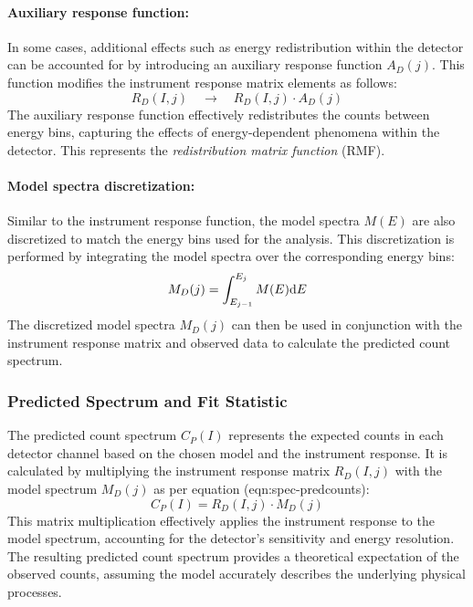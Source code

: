 				\paragraph{Auxiliary response function:}
				In some cases, additional effects such as energy redistribution within the detector can be accounted for by introducing an auxiliary response function $A_D(j)$. This function modifies the instrument response matrix elements as follows:
				\begin{equation*}
					R_D(I,j)\quad\rightarrow\quad R_D(I,j)\cdot A_D(j)
				\end{equation*}
				The auxiliary response function effectively redistributes the counts between energy bins, capturing the effects of energy-dependent phenomena within the detector. This represents the \textit{redistribution matrix function} (RMF).
				
				\paragraph{Model spectra discretization:}
				Similar to the instrument response function, the model spectra $M(E)$ are also discretized to match the energy bins used for the analysis. This discretization is performed by integrating the model spectra over the corresponding energy bins:
				\begin{equation}
					M_D(j)=\int_{E_{j-1}}^{E_j}{M(E)\mathrm{d}E} \label{eqn:spec-model}
				\end{equation}
				The discretized model spectra $M_D(j)$ can then be used in conjunction with the instrument response matrix and observed data to calculate the predicted count spectrum.

    		
    		\subsubsection{Predicted Spectrum and Fit Statistic}
    			The predicted count spectrum $C_P(I)$ represents the expected counts in each detector channel based on the chosen model and the instrument response. It is calculated by multiplying the instrument response matrix $R_D(I,j)$ with the model spectrum $M_D(j)$ as per equation (eqn:spec-predcounts):
    			\begin{equation}
					C_P(I)=R_D(I,j)\cdot M_D(j) \label{eqn:spec-predcounts}
				\end{equation}
				This matrix multiplication effectively applies the instrument response to the model spectrum, accounting for the detector's sensitivity and energy resolution. The resulting predicted count spectrum provides a theoretical expectation of the observed counts, assuming the model accurately describes the underlying physical processes.
				
